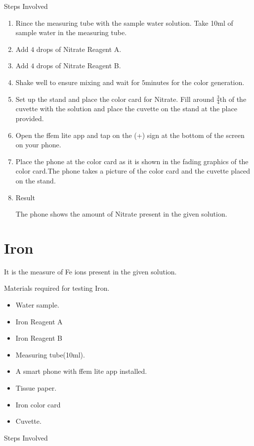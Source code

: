 \documentclass{article}
\begin{document}
 
 \begin{large}
 Steps Involved 
 \end{large}
 
 \begin{enumerate}
 \item Rince the measuring tube with the sample water solution. Take 10ml of sample water in the measuring tube.
 \item Add $4$ drops of Nitrate Reagent A.
 \item Add $4$ drops of Nitrate Reagent B.
 \item Shake well to ensure mixing and wait for $5$minutes for the color generation.
 \item Set up the stand and place the color card for Nitrate. Fill around $\frac{3}{4}$th of the cuvette with  the solution and place the cuvette on the stand at the place provided.
  \item Open the ffem lite app and tap on the (+) sign at the bottom of the screen on your phone.
 \item Place the phone at the color card as it is shown in the fading graphics of the color card.The phone takes a picture of the color card and the cuvette placed on the stand.
 \item Result 
 
 The phone shows the amount of Nitrate present in the given solution.
 \end{enumerate}

    \section{Iron}

  It is the measure of Fe ions present in the given solution.
    
     Materials required for testing Iron.
  \begin{itemize}
  \item Water sample.
  \item Iron Reagent A
  \item Iron Reagent B
  \item Measuring tube(10ml).
  \item A smart phone with ffem lite app installed.
  \item Tissue paper.
  \item  Iron color card
  \item  Cuvette.
  \end{itemize}

 
 \begin{large}
 Steps Involved 
 \end{large}
 
\end{document}
